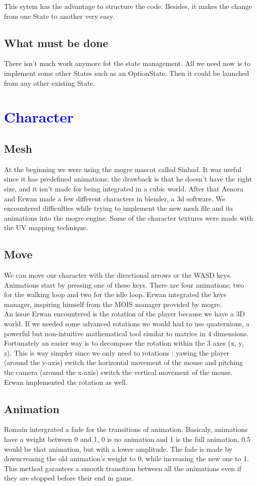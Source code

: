 \documentclass[article]{report} %
\begin{document}
This sytem has the advantage to structure the code. Besides, it makes the change from one State to another very easy.
			\section{What must be done}
				There isn't much work anymore fot the state management. All we need now is to implement some other States such as an OptionState. Then it could be launched from any other existing State.
				

		\chapter{\textcolor{blue}{Character}}
			\section{Mesh}
				At the beginning we were using the mogre mascot called Sinbad. It was useful since it has predefined animations; the drawback is that he doesn't have the right size, and it isn't made for being integrated in a cubic world. After that Aenora and Erwan made a few different characters in blender, a 3d software. We encountered difficulties while trying to implement the new mesh file and its animations into the mogre engine. Some of the character textures were made with the UV mapping technique.
			\section{Move}
				We can move our character with the directional arrows or the WASD keys. Animations start by pressing one of these keys. There are four animations; two for the walking loop and two for the idle loop. Erwan integrated the keys manager, inspiring himself from the MOIS manager provided by mogre.\\

An issue Erwan encountered is the rotation of the player because we have a 3D world. If we needed some advanced rotations we would had to use quaternions, a powerful but non-intuitive mathematical tool similar to matrice in 4 dimensions. Fortunately an easier way is to decompose the rotation within the 3 axes (x, y, z). This is way simpler since we only need to rotations : yawing the player (around the y-axis) switch the horizontal movement of the mouse and pitching the camera (around the x-axis) switch the vertical movement of the mouse. Erwan implemented the rotation as well.
			\section{Animation}
				Romain intergrated a fade for the transitions of animation. Basicaly, animations have a weight between 0 and 1, 0 is no animation and 1 is the full animation, 0.5 would be that animation, but with a lower amplitude. The fade is made by downcreasing the old animation's weight to 0, while increasing the new one to 1. This method garantees a smooth transition between all the animations even if they are stopped before their end in game.
\end{document}
